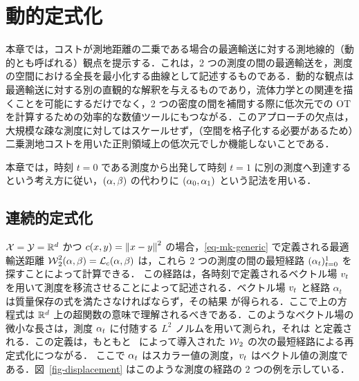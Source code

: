 
\chapter{動的定式化}
\label{c-dynamic}

本章では，コストが測地距離の二乗である場合の最適輸送に対する測地線的（動的とも呼ばれる）観点を提示する．これは，2 つの測度の間の最適輸送を，測度の空間における全長を最小化する曲線として記述するものである．動的な観点は最適輸送に対する別の直観的な解釈を与えるものであり，流体力学との関連を描くことを可能にするだけでなく，2 つの密度の間を補間する際に低次元での OT を計算するための効率的な数値ツールにもつながる．このアプローチの欠点は，大規模な疎な測度に対してはスケールせず，（空間を格子化する必要があるため）二乗測地コストを用いた正則領域上の低次元でしか機能しないことである．

本章では，時刻 $t=0$ である測度から出発して時刻 $t=1$ に別の測度へ到達するという考え方に従い，$(\alpha,\beta)$ の代わりに $(\alpha_0,\alpha_1)$ という記法を用いる．

\section{連続的定式化}

$\mathcal{X}=\mathcal{Y}=\mathbb{R}^d$ かつ $c(x,y)=\left\| x-y \right\|^2$ の場合，\eqref{eq-mk-generic} で定義される最適輸送距離 $\operatorname{\mathcal{W}}_2^2(\alpha,\beta) = \mathcal{L}_c(\alpha,\beta)$ は，これら 2 つの測度の間の最短経路 $(\alpha_t)_{t=0}^1$ を探すことによって計算できる．
%
この経路は，各時刻で定義されるベクトル場 $v_t$ を用いて測度を移流させることによって記述される．ベクトル場 $v_t$ と経路 $\alpha_t$ は質量保存の式を満たさなければならず，その結果
が得られる．ここで上の方程式は $\mathbb{R}^d$ 上の超関数の意味で理解されるべきである．このようなベクトル場の微小な長さは，測度 $\alpha_t$ に付随する $L^2$ ノルムを用いて測られ，それは
と定義される．この定義は，もともと~\citet{benamou2000computational} によって導入された $\operatorname{\mathcal{W}}_2$ の次の最短経路による再定式化につながる．
ここで $\alpha_t$ はスカラー値の測度，$v_t$ はベクトル値の測度である．図~\ref{fig-displacement} はこのような測度の経路の 2 つの例を示している．


